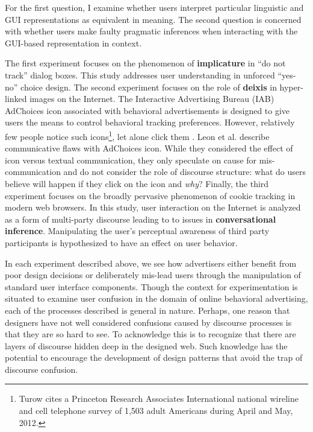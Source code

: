 For the first question, I examine whether users interpret particular linguistic and GUI representations as equivalent in meaning. The second question is concerned with whether users make faulty pragmatic inferences when interacting with the GUI-based representation in context.

The first experiment focuses on the phenomenon of \textbf{implicature} in ``do not track'' dialog boxes. This study addresses user understanding in unforced ``yes-no'' choice design. The second experiment focuses on the role of \textbf{deixis} in hyper-linked images on the Internet. The Interactive Advertising Bureau (IAB) AdChoices icon associated with behavioral advertisements is designed to give users the means to control behavioral tracking preferences. However, relatively few people notice such icons\footnote{Turow cites a Princeton Research Associates International national wireline and cell telephone survey of 1,503 adult Americans during April and May, 2012.}, let alone click them  \citep*{TheNonTransparency:2012ut,Logic:2011wn}.  Leon et al.  \citeyearpar{Leon:2012dk,Ur:2012ws}  describe communicative flaws with AdChoices icon. While they considered the effect of icon versus textual communication, they only speculate on cause for mis-communication and do not consider the role of discourse structure: what do users believe will happen if they click on the icon and \emph{why}? Finally, the third experiment focuses on the broadly pervasive phenomenon of cookie tracking in modern web browsers. In this study, user interaction on the Internet is analyzed as a form of multi-party discourse leading to to issues in \textbf{conversational inference}. Manipulating the user's perceptual awareness of third party participants is hypothesized to have an effect on user behavior. 

In each experiment described above, we see how advertisers either benefit from poor design decisions or deliberately mis-lead users through the manipulation of standard user interface components. Though the context for experimentation is situated to examine user confusion in the domain of online behavioral advertising, each of the processes described is general in nature. Perhaps, one reason that designers have not well considered confusions caused by discourse processes is that they are so hard to see. To acknowledge this is to recognize that there are layers of discourse hidden deep in the designed web. Such knowledge has the potential to encourage the development of design patterns that avoid the trap of discourse confusion.

